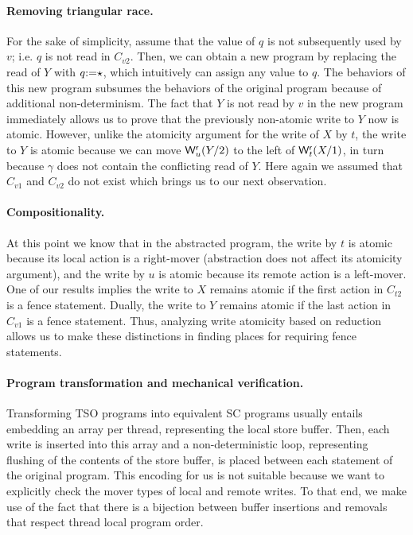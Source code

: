 \documentclass[preprint,9pt]{sigplanconf}
\begin{document}
\paragraph{Removing triangular race.}
For the sake of simplicity, assume that the value of $q$ is not subsequently used by $v$; i.e. $q$ is not read in $C_{v2}$.
Then, we can obtain a new program by replacing the read of $Y$ with $q\mathtt{:=}\star$, which intuitively can assign any value to $q$.
The behaviors of this new program subsumes the behaviors of the original program because of additional non-determinism. 
The fact that $Y$ is not read by $v$ in the new program immediately allows us to prove that the previously non-atomic write to $Y$ now is atomic. 
However, unlike the atomicity argument for the write of $X$ by $t$, the write to $Y$ is atomic because we can move $\mathsf{W}^{\mathsf{r}}_{u}(Y/2)$ to the left of $\mathsf{W}^{\mathsf{r}}_{t}(X/1)$, in turn because $\gamma$ does not contain the conflicting read of $Y$. 
Here again we assumed that $C_{v1}$ and $C_{v2}$ do not exist which brings us to our next observation.

\paragraph{Compositionality.}
At this point we know that in the abstracted program, the write by $t$ is atomic because its local action is a right-mover (abstraction does not affect its atomicity argument), and the write by $u$ is atomic because its remote action is a left-mover.
One of our results implies the write to $X$ remains atomic if the first action in $C_{t2}$ is a fence statement.
Dually, the write to $Y$ remains atomic if the last action in $C_{v1}$ is a fence statement.
Thus, analyzing write atomicity based on reduction allows us to make these distinctions in finding places for requiring fence statements.

\paragraph{Program transformation and mechanical verification.}
Transforming TSO programs into equivalent SC programs usually entails embedding an array per thread, representing the local store buffer.
Then, each write is inserted into this array and a non-deterministic loop, representing flushing of the contents of the store buffer, is placed between each statement of the original program.
This encoding for us is not suitable because we want to explicitly check the mover types of local and remote writes. 
To that end, we make use of the fact that there is a bijection between buffer insertions and removals that respect thread local program order.
\end{document}
